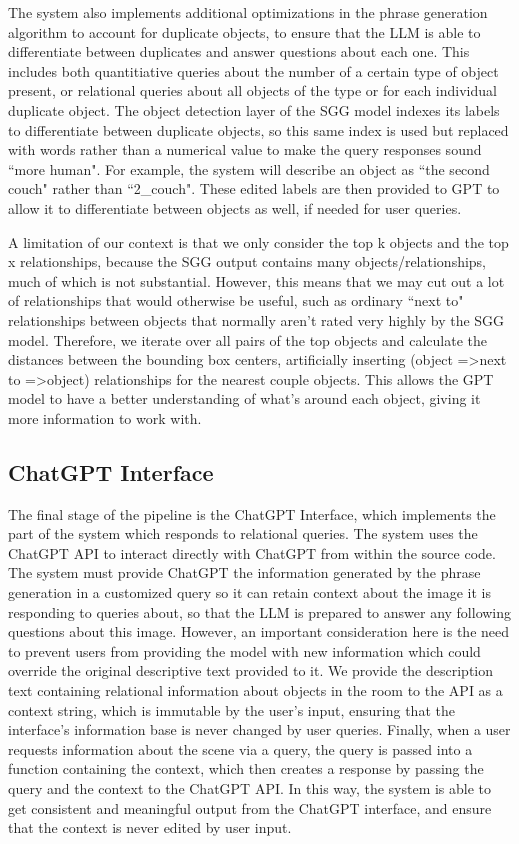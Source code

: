 \documentclass[letterpaper, 10 pt, conference]{ieeeconf}  %
\begin{document}
        The system also implements additional optimizations in the phrase generation algorithm to account for duplicate objects, to ensure that the LLM is able to differentiate between duplicates and answer questions about each one. This includes both quantitiative queries about the number of a certain type of object present, or relational queries about all objects of the type or for each individual duplicate object. The object detection layer of the SGG model indexes its labels to differentiate between duplicate objects, so this same index is used but replaced with words rather than a numerical value to make the query responses sound ``more human". For example, the system will describe an object as ``the second couch" rather than ``2\_couch". These edited labels are then provided to GPT to allow it to differentiate between objects as well, if needed for user queries.

        A limitation of our context is that we only consider the top k objects and the top x relationships, because the SGG output contains many objects/relationships, much of which is not substantial. However, this means that we may cut out a lot of relationships that would otherwise be useful, such as ordinary ``next to" relationships between objects that normally aren't rated very highly by the SGG model. Therefore, we iterate over all pairs of the top objects and calculate the distances between the bounding box centers, artificially inserting (object =\textgreater  next to =\textgreater  object) relationships for the nearest couple objects. This allows the GPT model to have a better understanding of what's around each object, giving it more information to work with.
    
    \subsection*{ChatGPT Interface}
        The final stage of the pipeline is the ChatGPT Interface, which implements the part of the system which responds to relational queries. The system uses the ChatGPT API to interact directly with ChatGPT from within the source code. The system must provide ChatGPT the information generated by the phrase generation in a customized query so it can retain context about the image it is responding to queries about, so that the LLM is prepared to answer any following questions about this image. However, an important consideration here is the need to prevent users from providing the model with new information which could override the original descriptive text provided to it. We provide the description text containing relational information about objects in the room to the API as a context string, which is immutable by the user's input, ensuring that the interface's information base is never changed by user queries. Finally, when a user requests information about the scene via a query, the query is passed into a function containing the context, which then creates a response by passing the query and the context to the ChatGPT API. In this way, the system is able to get consistent and meaningful output from the ChatGPT interface, and ensure that the context is never edited by user input.
\end{document}
